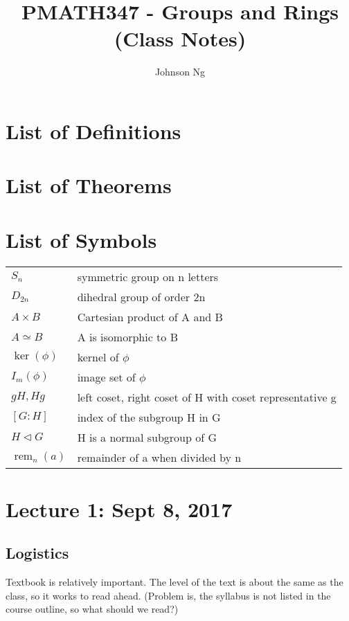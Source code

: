 \documentclass[11pt, oneside]{book}
\title{PMATH347 - Groups and Rings (Class Notes)}
\author{Johnson Ng}
\theoremstyle{break}
\DeclareMathOperator{\rem}{rem}
\begin{document}
\hypersetup{pageanchor=false}
\maketitle
\hypersetup{pageanchor=true}
\tableofcontents

\chapter*{List of Definitions}

\chapter*{List of Theorems}

\chapter*{List of Symbols}\label{symbol_list}
\begin{tabular}{l l}
    $S_n$               &   symmetric group on n letters \\
    $D_{2n}$            &   dihedral group of order 2n \\
    $A \times B$        &   Cartesian product of A and B \\
    $A \simeq B$        &   A is isomorphic to B \\
    $\ker(\phi)$        &   kernel of $\phi$ \\
    $I_m(\phi)$         &   image set of $\phi$ \\
    $gH, Hg$            &   left coset, right coset of H with coset representative g \\
    $[G : H]$           &   index of the subgroup H in G \\
    $H \triangleleft G$ &   H is a normal subgroup of G \\
    $\rem_n(a)$         &   remainder of a when divided by n \\

\end{tabular}

\chapter{Lecture 1: Sept 8, 2017}\label{lec1}

\section{Logistics}
Textbook is relatively important. The level of the text is about the same as the class, so it works to read ahead. (Problem is, the syllabus is not listed in the course outline, so what should we read?)
\end{document}
